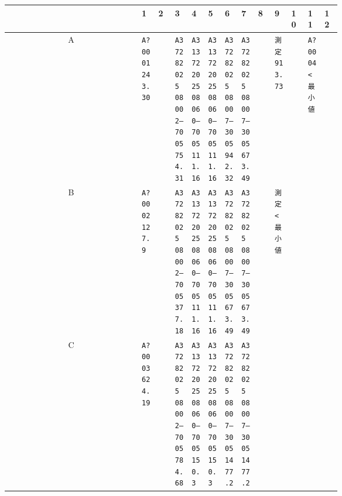 \documentclass[UTF8,10pt,a4paper,fontset=fandol]{ctexart}
\begin{document}
\begin{center}
\scriptsize
\begin{tabular}{c|*{12}{p{0.055\linewidth}|}}
 & 1 & 2 & 3 & 4 & 5 & 6 & 7 & 8 & 9 & 10 & 11 & 12\\ \hline
A &
\texttt{A?0001\\243.30} &
 &
\texttt{A37282025\\08002--7005\\754.31} &
\texttt{A313722025\\08060--7005\\111.16} &
\texttt{A313722025\\08060--7005\\111.16} &
\texttt{A37282025\\08007--3005\\942.32} &
\texttt{A37282025\\08007--3005\\673.49} &
 &
\texttt{測定\\913.73} &
 &
\texttt{A?0004\\\textless{}最小値}
\\ \hline
B &
\texttt{A?0002\\127.9} &
 &
\texttt{A37282025\\08002--7005\\377.18} &
\texttt{A313722025\\08060--7005\\111.16} &
\texttt{A313722025\\08060--7005\\111.16} &
\texttt{A37282025\\08007--3005\\673.49} &
\texttt{A37282025\\08007--3005\\673.49} &
 &
\texttt{測定\\\textless{}最小値} &
 &
 &
\\ \hline
C &
\texttt{A?0003\\624.19} &
 &
\texttt{A37282025\\08002--7005\\784.68} &
\texttt{A313722025\\08060--7005\\150.3} &
\texttt{A313722025\\08060--7005\\150.3} &
\texttt{A37282025\\08007--3005\\1477.2} &
\texttt{A37282025\\08007--3005\\1477.2} &

\end{tabular}
\end{center}
\end{document}
